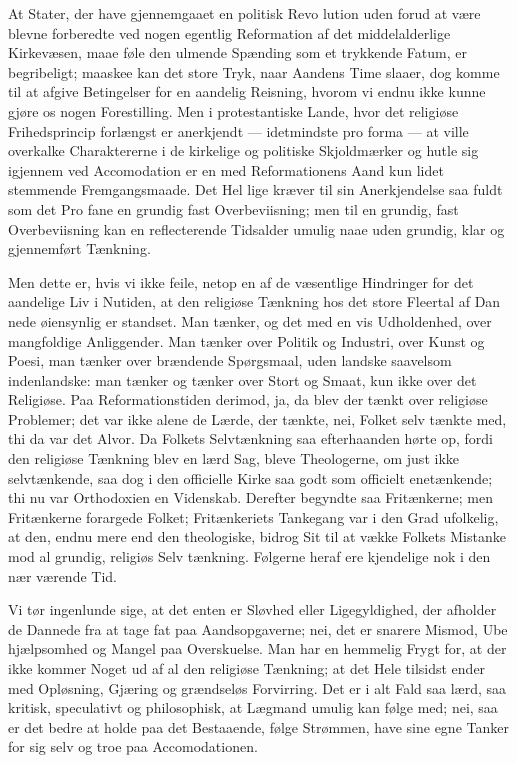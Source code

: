\documentclass[12pt]{book}
\newcommand{\opage}[1]{\marginnote{\footnotesize\textit{[#1]}}}
\begin{document}
At Stater, der have gjennemgaaet en politisk Revo\-%
lution uden forud at være blevne forberedte ved nogen
egentlig Reformation af det middelalderlige Kirkevæsen,
maae føle den ulmende Spænding som et trykkende
Fatum, er begribeligt; maaskee kan det store Tryk, naar
Aandens Time slaaer, dog komme til at afgive Betingelser
for en aandelig Reisning, hvorom vi endnu ikke kunne
gjøre os nogen Forestilling. Men i protestantiske Lande,
hvor det religiøse Frihedsprincip forlængst er anerkjendt ---
idetmindste pro forma --- at ville overkalke Charaktererne
i de kirkelige og politiske Skjoldmærker og hutle sig
igjennem ved Accomodation er en med Reformationens
Aand kun lidet stemmende Fremgangsmaade. Det Hel\-%
lige kræver til sin Anerkjendelse saa fuldt som det Pro\-%
fane en grundig fast Overbeviisning; men til en grundig,
fast Overbeviisning kan en reflecterende Tidsalder umulig
naae uden grundig, klar og gjennemført Tænkning.

Men dette er, hvis vi ikke feile, netop en af de
væsentlige Hindringer for det aandelige Liv i Nutiden,
at den religiøse Tænkning hos det store Fleertal af Dan\-%
nede øiensynlig er standset. Man tænker, og det med
en vis Udholdenhed, over mangfoldige Anliggender.
Man tænker over Politik og Industri, over Kunst og
Poesi, man tænker over brændende Spørgsmaal, uden\-%
landske saavelsom indenlandske: man tænker og tænker
over Stort og Smaat, kun ikke over det Religiøse. Paa
Reformationstiden derimod, ja, da blev der tænkt over
religiøse Problemer; det var ikke alene de Lærde, der
tænkte, nei, Folket selv tænkte med, thi da var det Alvor.
Da Folkets Selvtænkning saa efterhaanden hørte op,
fordi den religiøse Tænkning blev en lærd Sag, bleve
Theologerne, om just ikke selvtænkende, saa dog i den
\opage{109}\setcounter{footnote}{0}%
officielle Kirke saa godt som officielt enetænkende; thi
nu var Orthodoxien en Videnskab. Derefter begyndte
saa Fritænkerne; men Fritænkerne forargede Folket;
Fritænkeriets Tankegang var i den Grad ufolkelig, at
den, endnu mere end den theologiske, bidrog Sit til at
vække Folkets Mistanke mod al grundig, religiøs Selv\-%
tænkning. Følgerne heraf ere kjendelige nok i den nær\-%
værende Tid.

Vi tør ingenlunde sige, at det enten er Sløvhed eller
Ligegyldighed, der afholder de Dannede fra at tage fat
paa Aandsopgaverne; nei, det er snarere Mismod, Ube\-%
hjælpsomhed og Mangel paa Overskuelse. Man har en
hemmelig Frygt for, at der ikke kommer Noget ud af
al den religiøse Tænkning; at det Hele tilsidst ender med
Opløsning, Gjæring og grændseløs Forvirring. Det er i
alt Fald saa lærd, saa kritisk, speculativt og philosophisk,
at Lægmand umulig kan følge med; nei, saa er det bedre
at holde paa det Bestaaende, følge Strømmen, have sine
egne Tanker for sig selv og troe paa Accomodationen.
\end{document}
